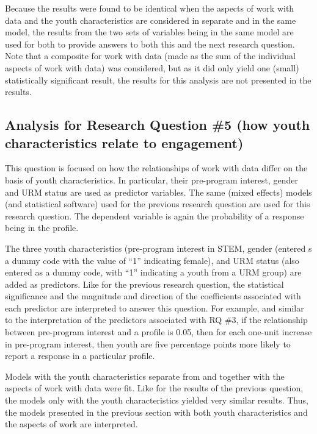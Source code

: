 \documentclass[]{msu-thesis}
\theoremstyle{definition}
\theoremstyle{definition}
\theoremstyle{definition}
\theoremstyle{remark}
\begin{document}
Because the results were found to be identical when the aspects of work
with data and the youth characteristics are considered in separate and
in the same model, the results from the two sets of variables being in
the same model are used for both to provide answers to both this and the
next research question. Note that a composite for work with data (made
as the sum of the individual aspects of work with data) was considered,
but as it did only yield one (small) statistically significant result,
the results for this analysis are not presented in the results.

\subsection{Analysis for Research Question \#5 (how youth
characteristics relate to
engagement)}\label{analysis-for-research-question-5-how-youth-characteristics-relate-to-engagement}

This question is focused on how the relationships of work with data
differ on the basis of youth characteristics. In particular, their
pre-program interest, gender and URM status are used as predictor
variables. The same (mixed effects) models (and statistical software)
used for the previous research question are used for this research
question. The dependent variable is again the probability of a response
being in the profile.

The three youth characteristics (pre-program interest in STEM, gender
(entered s a dummy code with the value of ``1'' indicating female), and
URM status (also entered as a dummy code, with ``1'' indicating a youth
from a URM group) are added as predictors. Like for the previous
research question, the statistical significance and the magnitude and
direction of the coefficients associated with each predictor are
interpreted to answer this question. For example, and similar to the
interpretation of the predictors associated with RQ \#3, if the
relationship between pre-program interest and a profile is 0.05, then
for each one-unit increase in pre-program interest, then youth are five
percentage points more likely to report a response in a particular
profile.

Models with the youth characteristics separate from and together with
the aspects of work with data were fit. Like for the results of the
previous question, the models only with the youth characteristics
yielded very similar results. Thus, the models presented in the previous
section with both youth characteristics and the aspects of work are
interpreted.
\end{document}
